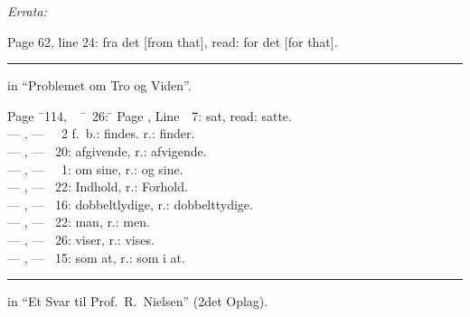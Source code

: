 \documentclass[12pt,a4paper]{book}
\begin{document}
\begin{center}
\emph{Errata:}
\end{center}

\noindent Page 62, line 24: fra det [from that], read: for det [for that].

\begin{center}\rule{2cm}{0.4pt}\end{center}

\begin{center}
in ``Problemet om Tro og Viden''.
\end{center}

\noindent
\begin{tabbing}
Page \=\ 114,\ \ \=\ \ 26: \=\kill
Page , \> Line\ \ 7: \> sat, read: satte.\\
--- , \> --- \ \ 2 f.\ b.: \> findes. r.: finder.\\
--- , \> --- \ 20: \> afgivende, r.: afvigende.\\
--- , \> --- \ \ 1: \> om sine, r.: og sine.\\
--- , \> --- \ 22: \> Indhold, r.: Forhold.\\
--- , \> --- \ 16: \> dobbeltlydige, r.: dobbelttydige.\\
--- , \> --- \ 22: \> man, r.: men.\\
--- , \> --- \ 26: \> viser, r.: vises.\\
--- , \> --- \ 15: \> som at, r.: som i at.
\end{tabbing}

\begin{center}\rule{2cm}{0.4pt}\end{center}

\begin{center}
in ``Et Svar til Prof.\ R.\ Nielsen'' (2det Oplag).
\end{center}
\end{document}
